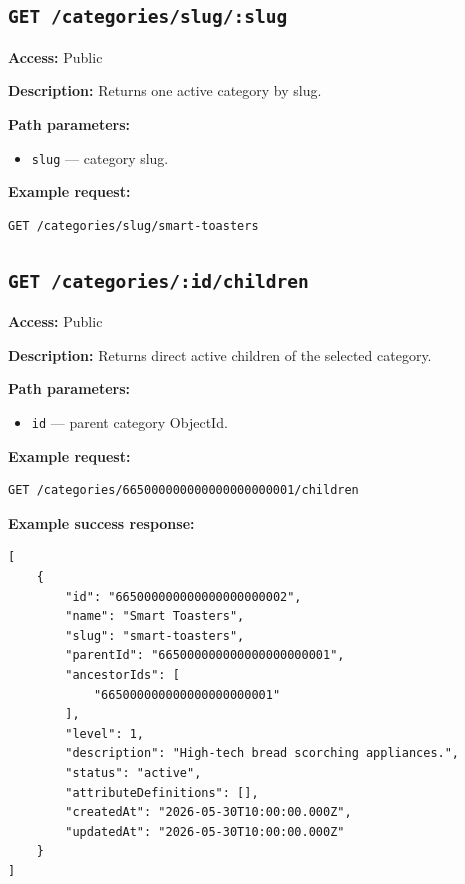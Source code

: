 \subsection{\texttt{GET /categories/slug/:slug}}

\textbf{Access:} Public

\textbf{Description:} Returns one active category by slug.

\textbf{Path parameters:}

\begin{itemize}
    \item \texttt{slug} --- category slug.
\end{itemize}

\textbf{Example request:}

\begin{verbatim}
GET /categories/slug/smart-toasters
\end{verbatim}

\subsection{\texttt{GET /categories/:id/children}}

\textbf{Access:} Public

\textbf{Description:} Returns direct active children of the selected category.

\textbf{Path parameters:}

\begin{itemize}
    \item \texttt{id} --- parent category ObjectId.
\end{itemize}

\textbf{Example request:}

\begin{verbatim}
GET /categories/665000000000000000000001/children
\end{verbatim}

\pagebreak
\textbf{Example success response:}

\begin{verbatim}
[
    {
        "id": "665000000000000000000002",
        "name": "Smart Toasters",
        "slug": "smart-toasters",
        "parentId": "665000000000000000000001",
        "ancestorIds": [
            "665000000000000000000001"
        ],
        "level": 1,
        "description": "High-tech bread scorching appliances.",
        "status": "active",
        "attributeDefinitions": [],
        "createdAt": "2026-05-30T10:00:00.000Z",
        "updatedAt": "2026-05-30T10:00:00.000Z"
    }
]
\end{verbatim}


